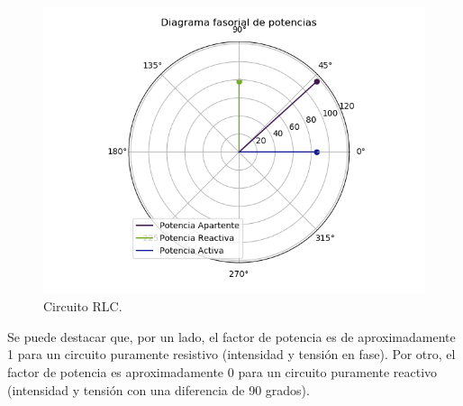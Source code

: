 \documentclass[a4paper]{article}
\begin{document}
\begin{figure}[H]
\begin{minipage}{.5\textwidth}
\end{minipage}\\
\begin{minipage}{.5\textwidth}
  \centering
  \includegraphics[width=1.2\linewidth]{Diag-Fas-2C}
  \caption{Circuito RLC.}
\end{minipage}
\end{figure}
 Se puede destacar que, por un lado, el factor de potencia es de aproximadamente 1 para un circuito puramente resistivo (intensidad y tensión en fase). Por otro, el factor de potencia es aproximadamente 0 para un circuito puramente reactivo (intensidad y tensión con una diferencia de 90 grados).
 
\end{document}
